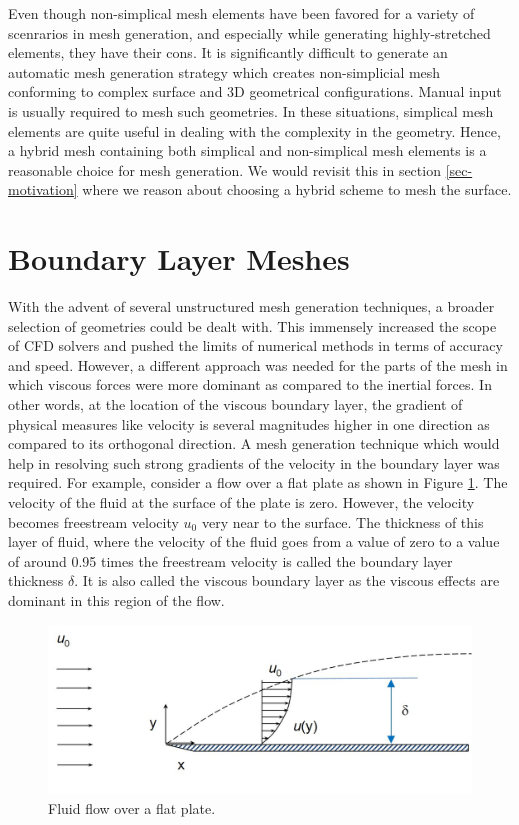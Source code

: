 Even though non-simplical mesh elements have been favored for a variety of scenrarios in mesh generation, and especially while generating highly-stretched elements, they have their cons. It is significantly difficult to generate an automatic mesh generation strategy which creates non-simplicial mesh conforming to complex surface and 3D geometrical configurations. Manual input is usually required to mesh such geometries. In these situations, simplical mesh elements are quite useful in dealing with the complexity in the geometry. Hence, a hybrid mesh containing both simplical and non-simplical mesh elements is a reasonable choice for mesh generation. We would revisit this in section \ref{sec-motivation} where we reason about choosing a hybrid scheme to mesh the surface.

\section{Boundary Layer Meshes}
\label{sec-boundaryLayerMesh}

With the advent of several unstructured mesh generation techniques, a broader selection of geometries could be dealt with. This immensely increased the scope of CFD solvers and pushed the limits of numerical methods in terms of accuracy and speed. However, a different approach was needed for the parts of the mesh in which viscous forces were more dominant as compared to the inertial forces. In other words, at the location of the viscous boundary layer, the gradient of physical measures like velocity is several magnitudes higher in one direction as compared to its orthogonal direction. A mesh generation technique which would help in resolving such strong gradients of the velocity in the boundary layer was required. For example, consider a flow over a flat plate as shown in Figure \ref{fig-boundaryLayer}. The velocity of the fluid at the surface of the plate is zero. However, the velocity becomes freestream velocity $u_0$ very near to the surface. The thickness of this layer of fluid, where the velocity of the fluid goes from a value of zero to a value of around 0.95 times the freestream velocity is called the boundary layer thickness $\delta$. It is also called the viscous boundary layer as the viscous effects are dominant in this region of the flow.

\begin{figure}
  \centering	
  \includegraphics[width=0.8\linewidth]{img/intro/boundaryLayer.jpg}
  \caption{Fluid flow over a flat plate.}
  \label{fig-boundaryLayer}
\end{figure}

